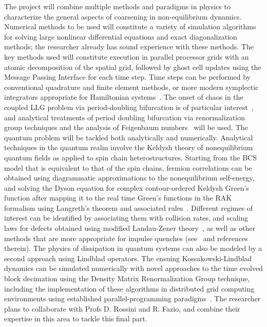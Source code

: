 \documentclass[a4paper,11pt,color]{article}
\begin{document}
The project will combine  multiple methods and paradigms in physics to characterize the general aspects of coarsening in non-equilibrium dynamics. Numerical methods to be used will constitute a variety of simulation algorithms for solving  large nonlinear differential equations and exact diagonalization methods; the researcher already has sound experience with these methods. The key methods used will constitute execution in parallel processor grids with an atomic decomposition of the spatial grid, followed by ghost cell updates using the Message Passing Interface for each time step. Time steps can be performed by conventional quadrature and finite element methods, or more modern symplectic integrators appropriate for Hamiltonian systems~\cite{symplectic}.   {The onset of chaos in the coupled LLG problem via period-doubling bifurcation is of particular interest}~\cite{gll:review}, and analytical treatments of period doubling bifurcation via renormalization group techniques and the analysis of Feigenbaum numbers~\cite{hilborn} will be used. The quantum problem will be tackled both analytically and numerically. Analytical techniques in the quantum realm involve the Keldysh theory of nonequilibrium quantum fields as applied to spin chain heterostructures. Starting from the BCS model that is equivalent to that of the spin chains, fermion correlations can be obtained using diagrammatic approximations to the nonequilibrium self-energy, and solving the Dyson equation for complex contour-ordered Keldysh Green's function after mapping it to the real time Green's functions in the RAK formalism using Langreth's theorem and associated rules~\cite{rammer, arrachea}. Different regimes of interest can be identified by associating them with collision rates, and scaling laws for defects obtained  using modified Landau-Zener theory~\cite{fermidyn}, as well as other methods that are more appropriate for 
impulse quenches (see~\cite{ncnsd2012} and references therein). The physics of dissipation in quantum systems can also be modeled by a second approach using Lindblad operators. The ensuing Kossakowski-Lindblad dynamics  can be simulated numerically with novel approaches to the time evolved block decimation using the Density Matrix Renormalization Group technique, including the implementation of these algorithms in distributed grid computing environments using established parallel-programming paradigms~\cite{white:pdmrg}. The researcher plans to collaborate with Profs D. Rossini and R. Fazio, and combine their expertise in this area to tackle this final part.
\end{document}
